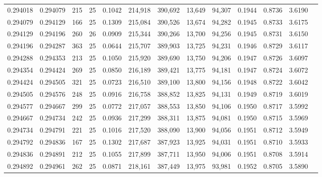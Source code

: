 \begin{tabular}{rrrrrrrrrrrrr}
0.294018 & 0.294079 &   215 &  25 &                                     0.1042 & 214,918 & 390,692 &  13,649 &  94,307 & 0.1944 & 0.8736 & 3.6190 \\
0.294079 & 0.294129 &   166 &  25 &                                     0.1309 & 215,084 & 390,526 &  13,674 &  94,282 & 0.1945 & 0.8733 & 3.6175 \\
0.294129 & 0.294196 &   260 &  26 &                                     0.0909 & 215,344 & 390,266 &  13,700 &  94,256 & 0.1945 & 0.8731 & 3.6150 \\
0.294196 & 0.294287 &   363 &  25 &                                     0.0644 & 215,707 & 389,903 &  13,725 &  94,231 & 0.1946 & 0.8729 & 3.6117 \\
0.294288 & 0.294353 &   213 &  25 &                                     0.1050 & 215,920 & 389,690 &  13,750 &  94,206 & 0.1947 & 0.8726 & 3.6097 \\
0.294354 & 0.294424 &   269 &  25 &                                     0.0850 & 216,189 & 389,421 &  13,775 &  94,181 & 0.1947 & 0.8724 & 3.6072 \\
0.294424 & 0.294505 &   321 &  25 &                                     0.0723 & 216,510 & 389,100 &  13,800 &  94,156 & 0.1948 & 0.8722 & 3.6042 \\
0.294505 & 0.294576 &   248 &  25 &                                     0.0916 & 216,758 & 388,852 &  13,825 &  94,131 & 0.1949 & 0.8719 & 3.6019 \\
0.294577 & 0.294667 &   299 &  25 &                                     0.0772 & 217,057 & 388,553 &  13,850 &  94,106 & 0.1950 & 0.8717 & 3.5992 \\
0.294667 & 0.294734 &   242 &  25 &                                     0.0936 & 217,299 & 388,311 &  13,875 &  94,081 & 0.1950 & 0.8715 & 3.5969 \\
0.294734 & 0.294791 &   221 &  25 &                                     0.1016 & 217,520 & 388,090 &  13,900 &  94,056 & 0.1951 & 0.8712 & 3.5949 \\
0.294792 & 0.294836 &   167 &  25 &                                     0.1302 & 217,687 & 387,923 &  13,925 &  94,031 & 0.1951 & 0.8710 & 3.5933 \\
0.294836 & 0.294891 &   212 &  25 &                                     0.1055 & 217,899 & 387,711 &  13,950 &  94,006 & 0.1951 & 0.8708 & 3.5914 \\
0.294892 & 0.294961 &   262 &  25 &                                     0.0871 & 218,161 & 387,449 &  13,975 &  93,981 & 0.1952 & 0.8705 & 3.5890 \\

\end{tabular}
